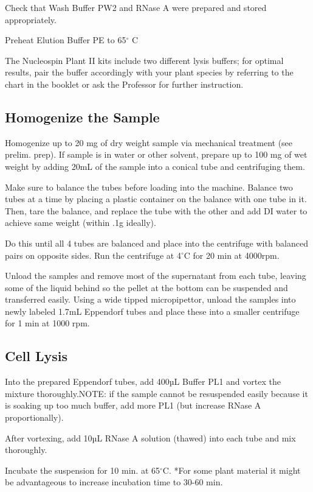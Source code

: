 \documentclass[12pt]{../SOP3_alpha}
\begin{document}
\NP	Check that Wash Buffer PW2 and RNase A were prepared and stored appropriately.

\NP Preheat Elution Buffer PE to 65$^\circ$ C

\NP The Nucleospin Plant II kits include two different lysis buffers; for optimal results, pair the buffer accordingly with your plant species by referring to the chart in the booklet or ask the Professor for further instruction. 


\subsection*{Homogenize the Sample}

\NP Homogenize up to 20 mg of dry weight sample via mechanical treatment (see prelim. prep). If sample is in water or other solvent, prepare up to 100 mg of wet weight by adding 20mL of the sample into a conical tube and centrifuging them. 

\NP Make sure to balance the tubes before loading into the machine. Balance two tubes at a time by placing a plastic container on the balance with one tube in it. Then, tare the balance, and replace the tube with the other and add DI water to achieve same weight (within .1g ideally).

\NP Do this until all 4 tubes are balanced and place into the centrifuge with balanced pairs on opposite sides. Run the centrifuge at 4$^\circ$C for 20 min at 4000rpm.

\NP Unload the samples and remove most of the supernatant from each tube, leaving some of the liquid behind so the pellet at the bottom can be suspended and transferred easily. Using a wide tipped micropipettor, unload the samples into newly labeled 1.7mL Eppendorf tubes and place these into a smaller centrifuge for 1 min at 1000 rpm.


\subsection*{Cell Lysis}

\NP Into the prepared Eppendorf tubes, add 400µL Buffer PL1 and vortex the mixture thoroughly.NOTE: if the sample cannot be resuspended easily because it is soaking up too much buffer, add more PL1 (but increase RNase A proportionally).

\NP After vortexing, add 10µL RNase A solution (thawed) into each tube and mix thoroughly.

\NP Incubate the suspension for 10 min. at 65$^\circ$C. *For some plant material it might be advantageous to increase incubation time to 30-60 min. 
\end{document}
